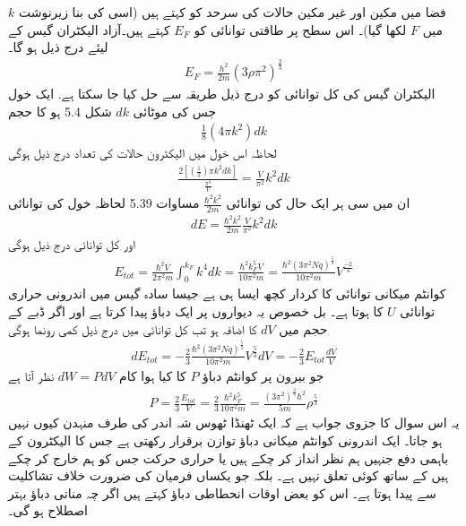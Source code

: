 $k$ فضا میں مکین اور غیر مکین حالات کی سرحد کو  کہتے ہیں (اسی کی بنا زیرنوشت میں $F$ لکھا گیا)۔
اس سطح پر طاقتی توانائی کو  $E_F$ کہتے ہیں۔آزاد الیکٹران گیس کے لیئے درج ذیل ہو گا۔
\begin{align}
	E_F = \frac{h^{2}}{2m}(3\rho\pi^{2})^{\frac{2}{3}}
\end{align}
الیکٹران گیس کی کل توانائی کو درج ذیل طریقہ سے حل کیا جا سکتا ہے. ایک خول جس کی موٹائی $dk$ شکل \num{5.4} ہو کا حجم
\begin{align*}
	\frac{1}{8}(4\pi k^{2})dk
\end{align*}
لحاظہ اس خول میں الیکٹرون حالات کی تعداد درج ذیل ہوگی
\begin{align*}
	\frac{2[(\frac{1}{2})\pi k^{2}dk]}{\frac{\pi^{3}}{V}} = \frac{V}{\pi^{2}}k^{2}dk
\end{align*}
ان میں سی ہر ایک حال کی توانائی \(\frac{\hbar^{2}k^{2}}{2m}\) مساوات \num{5.39} لحاظہ خول کی توانائی
\begin{align}
	dE = \frac{\hbar^{2}k^2}{2m} \frac{V}{\pi^{2}}k^{2}dk
\end{align}
اور کل توانائی درج ذیل ہوگی
\begin{align}
	E_{tot}=\frac{\hbar^{2}V}{2\pi^{2}m}\int_{0}^{k_F}k^{4}dk = \frac{\hbar^{2}k^{5}_F V}{10\pi^{2}m} = \frac{\hbar^{2}(3\pi^{2}Nq)^{\frac{5}{3}}}{10\pi^{2}m}V^{\frac{-2}{3}}
\end{align}
کوانٹم میکانی توانائی کا کردار کچھ ایسا ہی ہے جیسا سادہ گیس میں اندرونی حراری توانائی $U$ کا ہوتا ہے۔ بل خصوص یہ دیواروں پر ایک دباؤ پیدا کرتا ہے اور اگر ڈبے کے حجم میں $dV$ کا اضافہ ہو تب کل توانائی میں درج ذیل کمی رونما ہوگی
\begin{align*}
	dE_{tot} = -\frac{2}{3}\frac{\hbar^2(3\pi^{2}Nq)^{\frac{5}{3}}}{10\pi^{2}m}V^{\frac{5}{3}}dV = -\frac{2}{3}E_{tot}\frac{dV}{V}
\end{align*}
جو بیرون پر کوانٹم دباؤ $P$ کا کیا ہوا کام \(dW = PdV\) نظر آتا ہے
\begin{align}
	P = \frac{2}{3}\frac{E_{tot}}{V} = \frac{2}{3}\frac{\hbar^{2}k^{5}_F}{10\pi^{2}m} = \frac{(3\pi^{2})^{\frac{2}{3}}\hbar^{2}}{5m}\rho^{\frac{5}{3}}
\end{align}
یہ اس سوال کا جزوی جواب ہے کہ ایک ٹھنڈا ٹھوس شہ اندر کی طرف منہدن کیوں نہیں ہو جاتا۔ ایک اندرونی کوانٹم میکانی دباؤ توازن برقرار رکھتی ہے جس کا الیکٹرون کے  باہمی دفع جنہیں ہم نظر انداز کر چکے ہیں یا حراری حرکت جس کو ہم خارج کر چکے ہیں کے ساتھ کوئی تعلق نہیں ہے۔ بلکہ جو یکساں فرمیان کی ضرورت خلاف تشاکلیت سے پیدا ہوتا ہے۔ اس کو بعض اوقات انحطاطی دباؤ کہتے ہیں اگر چہ مناتی دباؤ بہتر اصطلاح ہو گی۔

